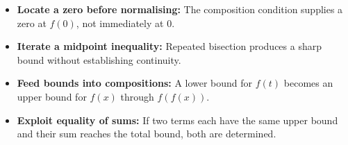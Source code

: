 \begin{takeaways}
\begin{itemize}
\item \textbf{Locate a zero before normalising:} The composition condition supplies a zero at \(f(0)\), not immediately at \(0\).
\item \textbf{Iterate a midpoint inequality:} Repeated bisection produces a sharp bound without establishing continuity.
\item \textbf{Feed bounds into compositions:} A lower bound for \(f(t)\) becomes an upper bound for \(f(x)\) through \(f(f(x))\).
\item \textbf{Exploit equality of sums:} If two terms each have the same upper bound and their sum reaches the total bound, both are determined.
\end{itemize}
\end{takeaways}
